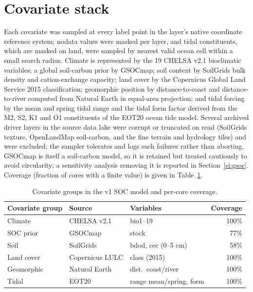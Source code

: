 \documentclass[10pt]{extarticle}
\begin{document}
\section{Covariate stack}
Each covariate was sampled at every label point in the layer's native coordinate
reference system; nodata values were masked per layer, and tidal constituents, which are masked on land, were sampled by nearest valid ocean cell within a small search
radius. Climate is represented by the 19 CHELSA v2.1 bioclimatic variables; a global
soil-carbon prior by GSOCmap; soil context by SoilGrids bulk density and cation-exchange
capacity; land cover by the Copernicus Global Land Service 2015 classification;
geomorphic position by distance-to-coast and distance-to-river computed from Natural
Earth in equal-area projection; and tidal forcing by the mean and spring tidal range and
the tidal form factor derived from the M2, S2, K1 and O1 constituents of the EOT20 ocean
tide model. Several archived driver layers in the source data lake were corrupt or truncated on read (SoilGrids texture, OpenLandMap soil-carbon, and the fine terrain and hydrology tiles) and were excluded; the sampler tolerates and logs such failures rather
than aborting. GSOCmap is itself a soil-carbon model, so it is retained but treated
cautiously to avoid circularity; a sensitivity analysis removing it is reported in
Section~\ref{si:gsoc}. Coverage (fraction of cores with a finite value) is given in
Table~\ref{tab:covcoverage}.

\begin{table}[h]
\centering
\caption{Covariate groups in the v1 SOC model and per-core coverage.}
\label{tab:covcoverage}
\begin{tabular}{lllr}
\toprule
Covariate group & Source & Variables & Coverage \\
\midrule
Climate    & CHELSA v2.1    & bio1--19                & 100\% \\
SOC prior  & GSOCmap        & stock                   & 77\% \\
Soil       & SoilGrids      & bdod, cec (0--5 cm)     & 58\% \\
Land cover & Copernicus LULC& class (2015)            & 100\% \\
Geomorphic & Natural Earth  & dist.\ coast/river      & 100\% \\
Tidal      & EOT20          & range mean/spring, form & 100\% \\
\bottomrule
\end{tabular}
\end{table}
\end{document}
